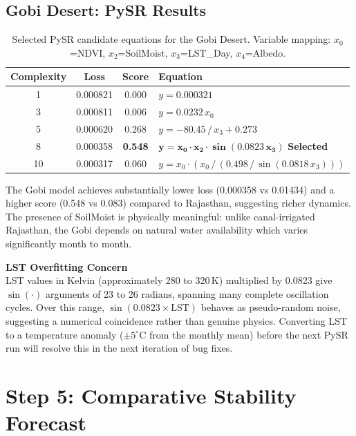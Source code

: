 \documentclass[12pt, a4paper]{article}
\begin{document}
\subsection{Gobi Desert: PySR Results}

\begin{table}[H]
\centering
\caption{Selected PySR candidate equations for the Gobi Desert. Variable
mapping: $x_0$=NDVI, $x_2$=SoilMoist, $x_3$=LST\_Day, $x_4$=Albedo.}
\label{tab:pysr_gobi}
\begin{tabularx}{\textwidth}{c c c X}
\toprule
\textbf{Complexity} & \textbf{Loss} & \textbf{Score} & \textbf{Equation} \\
\midrule
1  & 0.000821 & 0.000 & $y = 0.000321$ \\
3  & 0.000811 & 0.006 & $y = 0.0232\,x_0$ \\
5  & 0.000620 & 0.268 & $y = -80.45\,/\,x_3 + 0.273$ \\
8  & 0.000358 & \textbf{0.548} &
    $\mathbf{y = x_0 \cdot x_2 \cdot \sin(0.0823\,x_3)}$
    \quad \textbf{Selected} \\
10 & 0.000317 & 0.060 &
    $y = x_0 \cdot (x_0\,/\,(0.498\,/\,\sin(0.0818\,x_3)))$ \\
\bottomrule
\end{tabularx}
\end{table}

The Gobi model achieves substantially lower loss (0.000358 vs 0.01434) and
a higher score (0.548 vs 0.083) compared to Rajasthan, suggesting richer
dynamics. The presence of SoilMoist is physically meaningful: unlike
canal-irrigated Rajasthan, the Gobi depends on natural water availability
which varies significantly month to month.

\begin{mdframed}[style=warnbox]
\textbf{\textcolor{warnred}{LST Overfitting Concern}}\\[4pt]
LST values in Kelvin (approximately 280 to 320\,K) multiplied by 0.0823
give $\sin(\cdot)$ arguments of 23 to 26 radians, spanning many complete
oscillation cycles. Over this range, $\sin(0.0823 \times \text{LST})$
behaves as pseudo-random noise, suggesting a numerical coincidence rather
than genuine physics. Converting LST to a temperature anomaly
($\pm 5^{\circ}$C from the monthly mean) before the next PySR run will
resolve this in the next iteration of bug fixes.
\end{mdframed}

\section{Step 5: Comparative Stability Forecast}
\end{document}
